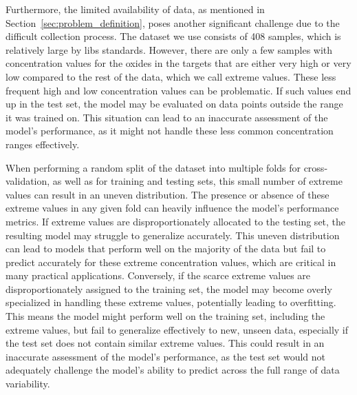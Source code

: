 Furthermore, the limited availability of data, as mentioned in Section~\ref{sec:problem_definition}, poses another significant challenge due to the difficult collection process.
The dataset we use consists of 408 samples, which is relatively large by \gls{libs} standards.
However, there are only a few samples with concentration values for the oxides in the targets that are either very high or very low compared to the rest of the data, which we call extreme values.
These less frequent high and low concentration values can be problematic.
If such values end up in the test set, the model may be evaluated on data points outside the range it was trained on.
This situation can lead to an inaccurate assessment of the model's performance, as it might not handle these less common concentration ranges effectively.

When performing a random split of the dataset into multiple folds for cross-validation, as well as for training and testing sets, this small number of extreme values can result in an uneven distribution.
The presence or absence of these extreme values in any given fold can heavily influence the model's performance metrics.
If extreme values are disproportionately allocated to the testing set, the resulting model may struggle to generalize accurately.
This uneven distribution can lead to models that perform well on the majority of the data but fail to predict accurately for these extreme concentration values, which are critical in many practical applications.
Conversely, if the scarce extreme values are disproportionately assigned to the training set, the model may become overly specialized in handling these extreme values, potentially leading to overfitting.
This means the model might perform well on the training set, including the extreme values, but fail to generalize effectively to new, unseen data, especially if the test set does not contain similar extreme values.
This could result in an inaccurate assessment of the model's performance, as the test set would not adequately challenge the model's ability to predict across the full range of data variability.

